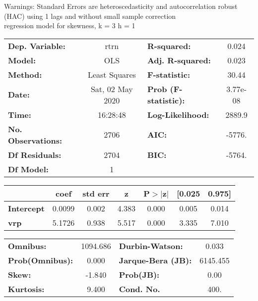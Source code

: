 Warnings: \newline
 [1] Standard Errors are heteroscedasticity and autocorrelation robust (HAC) using 1 lags and without small sample correction\\ 

regression model for skewness, k = 3 h = 1\begin{center}
\begin{tabular}{lclc}
\toprule
\textbf{Dep. Variable:}    &       rtrn       & \textbf{  R-squared:         } &     0.024   \\
\textbf{Model:}            &       OLS        & \textbf{  Adj. R-squared:    } &     0.023   \\
\textbf{Method:}           &  Least Squares   & \textbf{  F-statistic:       } &     30.44   \\
\textbf{Date:}             & Sat, 02 May 2020 & \textbf{  Prob (F-statistic):} &  3.77e-08   \\
\textbf{Time:}             &     16:28:48     & \textbf{  Log-Likelihood:    } &    2889.9   \\
\textbf{No. Observations:} &        2706      & \textbf{  AIC:               } &    -5776.   \\
\textbf{Df Residuals:}     &        2704      & \textbf{  BIC:               } &    -5764.   \\
\textbf{Df Model:}         &           1      & \textbf{                     } &             \\
\bottomrule
\end{tabular}
\begin{tabular}{lcccccc}
                   & \textbf{coef} & \textbf{std err} & \textbf{z} & \textbf{P$> |$z$|$} & \textbf{[0.025} & \textbf{0.975]}  \\
\midrule
\textbf{Intercept} &       0.0099  &        0.002     &     4.383  &         0.000        &        0.005    &        0.014     \\
\textbf{vrp}       &       5.1726  &        0.938     &     5.517  &         0.000        &        3.335    &        7.010     \\
\bottomrule
\end{tabular}
\begin{tabular}{lclc}
\textbf{Omnibus:}       & 1094.686 & \textbf{  Durbin-Watson:     } &    0.033  \\
\textbf{Prob(Omnibus):} &   0.000  & \textbf{  Jarque-Bera (JB):  } & 6145.455  \\
\textbf{Skew:}          &  -1.840  & \textbf{  Prob(JB):          } &     0.00  \\
\textbf{Kurtosis:}      &   9.400  & \textbf{  Cond. No.          } &     400.  \\
\bottomrule
\end{tabular}
\end{center}

